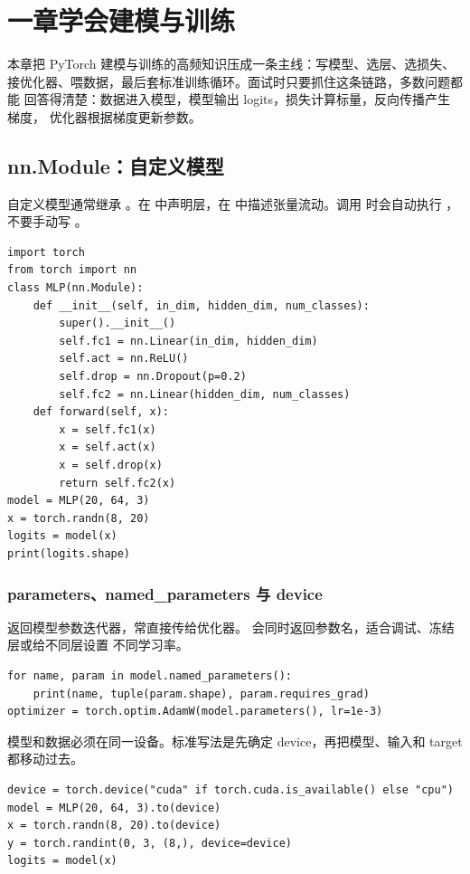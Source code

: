 \chapter{一章学会建模与训练}
本章把 PyTorch 建模与训练的高频知识压成一条主线：写模型、选层、选损失、
接优化器、喂数据，最后套标准训练循环。面试时只要抓住这条链路，多数问题都能
回答得清楚：数据进入模型，模型输出 logits，损失计算标量，反向传播产生梯度，
优化器根据梯度更新参数。
\section{nn.Module：自定义模型}
自定义模型通常继承 。在  中声明层，在
 中描述张量流动。调用  时会自动执行
，不要手动写 。
\begin{lstlisting}
import torch
from torch import nn
class MLP(nn.Module):
    def __init__(self, in_dim, hidden_dim, num_classes):
        super().__init__()
        self.fc1 = nn.Linear(in_dim, hidden_dim)
        self.act = nn.ReLU()
        self.drop = nn.Dropout(p=0.2)
        self.fc2 = nn.Linear(hidden_dim, num_classes)
    def forward(self, x):
        x = self.fc1(x)
        x = self.act(x)
        x = self.drop(x)
        return self.fc2(x)
model = MLP(20, 64, 3)
x = torch.randn(8, 20)
logits = model(x)
print(logits.shape)
\end{lstlisting}
\subsection{parameters、named\_parameters 与 device}
 返回模型参数迭代器，常直接传给优化器。
 会同时返回参数名，适合调试、冻结层或给不同层设置
不同学习率。
\begin{lstlisting}
for name, param in model.named_parameters():
    print(name, tuple(param.shape), param.requires_grad)
optimizer = torch.optim.AdamW(model.parameters(), lr=1e-3)
\end{lstlisting}
模型和数据必须在同一设备。标准写法是先确定 device，再把模型、输入和 target
都移动过去。
\begin{lstlisting}
device = torch.device("cuda" if torch.cuda.is_available() else "cpu")
model = MLP(20, 64, 3).to(device)
x = torch.randn(8, 20).to(device)
y = torch.randint(0, 3, (8,), device=device)
logits = model(x)
\end{lstlisting}
